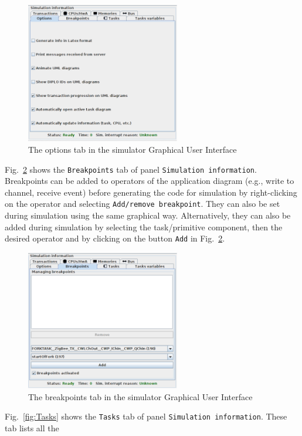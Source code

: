 \documentclass{llncs}
\begin{document}
\begin{figure}[!htbp]
	\centering
	\includegraphics[width=0.6\textwidth]{figures/screenshot/Options.png}
	\caption{The options tab in the simulator Graphical User Interface}
	\label{fig:Options}
\end{figure}
%
Fig.~\ref{fig:Breakpoints} shows the \texttt{Breakpoints} tab of panel \texttt{Simulation information}. Breakpoints can
be added to operators of the application diagram (e.g., write to channel, receive event) before generating the code for
simulation by right-clicking on the operator and selecting \texttt{Add/remove breakpoint}. They can also be set during 
simulation using the same graphical way. Alternatively, they can also
be added during simulation by selecting the task/primitive component, then the desired operator and by clicking on the
button \texttt{Add} in Fig.~\ref{fig:Breakpoints}.
%
\begin{figure}[!htbp]
	\centering
	\includegraphics[width=0.6\textwidth]{figures/screenshot/Breakpoints.png}
	\caption{The breakpoints tab in the simulator Graphical User Interface}
	\label{fig:Breakpoints}
\end{figure}
%
Fig.~\ref{fig:Tasks} shows the \texttt{Tasks} tab of panel \texttt{Simulation information}. These tab lists all the
\end{document}
